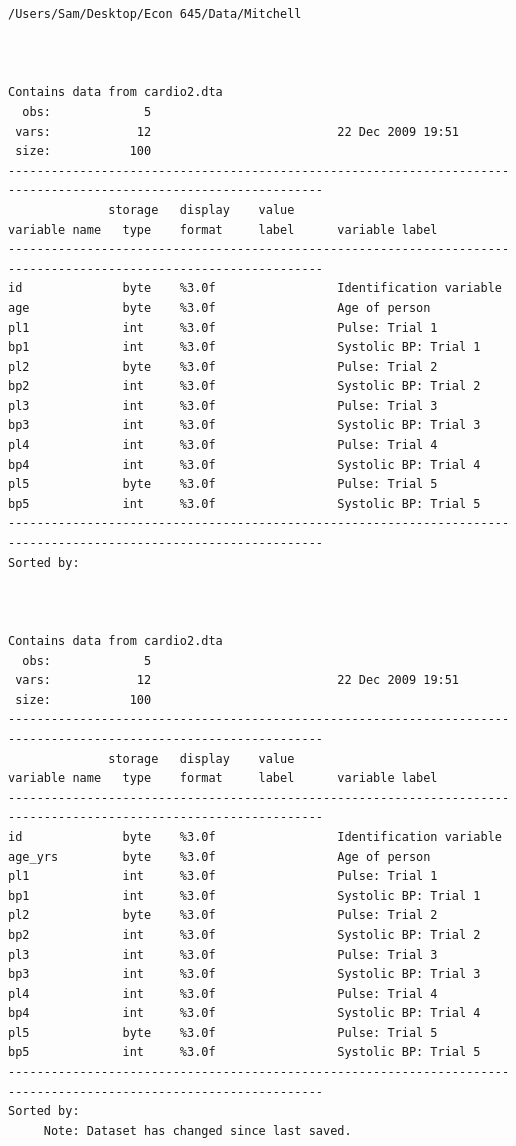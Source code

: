 \documentclass[
]{book}
\begin{document}
\begin{verbatim}
/Users/Sam/Desktop/Econ 645/Data/Mitchell



Contains data from cardio2.dta
  obs:             5                          
 vars:            12                          22 Dec 2009 19:51
 size:           100                          
------------------------------------------------------------------------------------------------------------------
              storage   display    value
variable name   type    format     label      variable label
------------------------------------------------------------------------------------------------------------------
id              byte    %3.0f                 Identification variable
age             byte    %3.0f                 Age of person
pl1             int     %3.0f                 Pulse: Trial 1
bp1             int     %3.0f                 Systolic BP: Trial 1
pl2             byte    %3.0f                 Pulse: Trial 2
bp2             int     %3.0f                 Systolic BP: Trial 2
pl3             int     %3.0f                 Pulse: Trial 3
bp3             int     %3.0f                 Systolic BP: Trial 3
pl4             int     %3.0f                 Pulse: Trial 4
bp4             int     %3.0f                 Systolic BP: Trial 4
pl5             byte    %3.0f                 Pulse: Trial 5
bp5             int     %3.0f                 Systolic BP: Trial 5
------------------------------------------------------------------------------------------------------------------
Sorted by: 



Contains data from cardio2.dta
  obs:             5                          
 vars:            12                          22 Dec 2009 19:51
 size:           100                          
------------------------------------------------------------------------------------------------------------------
              storage   display    value
variable name   type    format     label      variable label
------------------------------------------------------------------------------------------------------------------
id              byte    %3.0f                 Identification variable
age_yrs         byte    %3.0f                 Age of person
pl1             int     %3.0f                 Pulse: Trial 1
bp1             int     %3.0f                 Systolic BP: Trial 1
pl2             byte    %3.0f                 Pulse: Trial 2
bp2             int     %3.0f                 Systolic BP: Trial 2
pl3             int     %3.0f                 Pulse: Trial 3
bp3             int     %3.0f                 Systolic BP: Trial 3
pl4             int     %3.0f                 Pulse: Trial 4
bp4             int     %3.0f                 Systolic BP: Trial 4
pl5             byte    %3.0f                 Pulse: Trial 5
bp5             int     %3.0f                 Systolic BP: Trial 5
------------------------------------------------------------------------------------------------------------------
Sorted by: 
     Note: Dataset has changed since last saved.
\end{verbatim}
\end{document}
